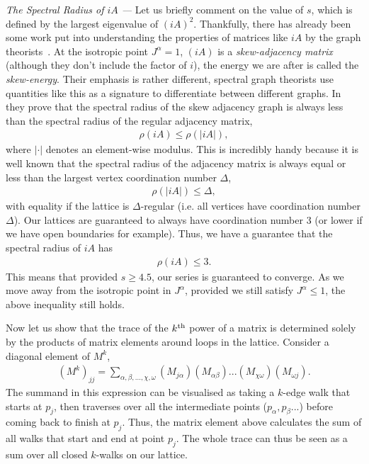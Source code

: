 \begin{shaded}
    {\it The Spectral Radius of $iA$ --- }
    Let us briefly comment on the value of $s$, which is defined by the largest eigenvalue of $(iA)^2$. Thankfully, there has already been some work put into understanding the properties of matrices like $iA$ by the graph theorists~\cite{adiga_skew_2010,cavers_skew-adjacency_2012}. At the isotropic point $J^\alpha = 1$, $(iA)$ is a \textit{skew-adjacency matrix} (although they don't include the factor of $i$), the energy we are after is called the \textit{skew-energy}. Their emphasis is rather different, spectral graph theorists use quantities like this as a signature to differentiate between different graphs. In~\cite{cavers_skew-adjacency_2012} they prove that the spectral radius of the skew adjacency graph is always less than the spectral radius of the regular adjacency matrix,
    \begin{align}
        \rho(iA) \leq \rho ( |iA| ),
    \end{align}
    where $|\cdot|$ denotes an element-wise modulus. This is incredibly handy because it is well known that the spectral radius of the adjacency matrix is always equal or less than the largest vertex coordination number $\Delta$,
    \begin{align}
        \rho(|iA|) \leq \Delta,
    \end{align}
    with equality if the lattice is $\Delta$-regular (i.e. all vertices have coordination number $\Delta$). Our lattices are guaranteed to always have coordination number 3 (or lower if we have open boundaries for example). Thus, we have a guarantee that the spectral radius of $iA$ has
    \begin{align}
        \rho(iA) \leq 3.
    \end{align}
    This means that provided $s \geq 4.5$, our series is guaranteed to converge. As we move away from the isotropic point in $J^\alpha$, provided we still satisfy $J^\alpha \leq 1$, the above inequality still holds. 
\end{shaded}

Now let us show that the trace of the $k^{\textup{th}}$ power of a matrix is determined solely by the products of matrix elements around loops in the lattice. Consider a diagonal element of $M^k$,
\begin{align}\label{eqn:power_sum}
    (M^k)_{jj} = \sum_{\alpha, \beta, ... ,\chi, \omega} (M_{j\alpha})(M_{\alpha\beta})...(M_{\chi\omega})(M_{\omega j}).
\end{align}
The summand in this expression can be visualised as taking a $k$-edge walk that starts at $p_j$, then traverses over all the intermediate points ($p_\alpha, p_\beta ...$) before coming back to finish at $p_j$. Thus, the matrix element above calculates the sum of all walks that start and end at point $p_j$. The whole trace can thus be seen as a sum over all closed $k$-walks on our lattice. 

